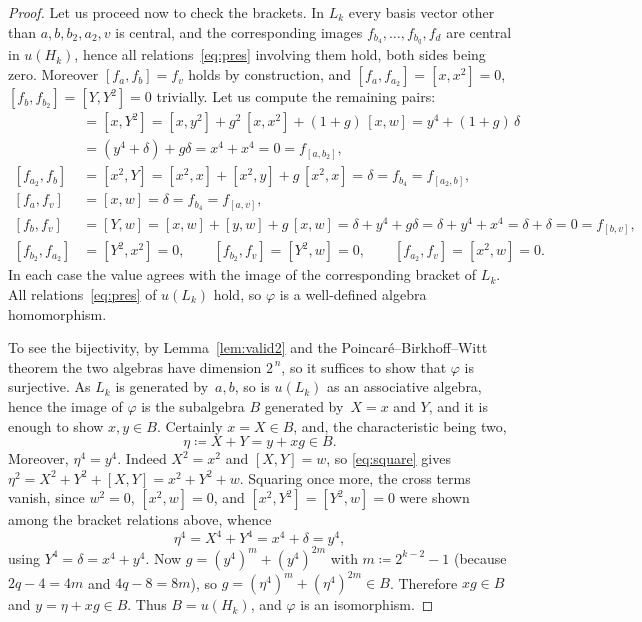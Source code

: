 \documentclass[10pt,a4paper]{amsart}
\begin{document}
\begin{proof}
Let us proceed now to check the brackets. In $L_k$ every basis vector other than
$a,b,b_2,a_2,v$ is central, and the corresponding images
$f_{b_4},\dots,f_{b_q},f_d$ are central in $u(H_k)$, hence all relations~\eqref{eq:pres} involving them hold, both sides being zero. Moreover
$[f_a,f_b]=f_v$ holds by construction, and
$[f_a,f_{a_2}]=[x,x^2]=0$, $[f_b,f_{b_2}]=[Y,Y^2]=0$ trivially. Let us compute the remaining pairs:
\begin{align*}
[f_a,f_{b_2}]&=[x,Y^2]=[x,y^2]+g^2\,[x,x^2]+(1+g)\,[x,w]
=y^4+(1+g)\,\delta\\
&=(y^4+\delta)+g\delta=x^4+x^4=0=f_{[a,b_2]},\\[2pt]
[f_{a_2},f_b]&=[x^2,Y]=[x^2,x]+[x^2,y]+g\,[x^2,x]=\delta
=f_{b_4}=f_{[a_2,b]},\\[2pt]
[f_a,f_v]&=[x,w]=\delta=f_{b_4}=f_{[a,v]},\\[2pt]
[f_b,f_v]&=[Y,w]=[x,w]+[y,w]+g\,[x,w]=\delta+y^4+g\delta
=\delta+y^4+x^4=\delta+\delta=0=f_{[b,v]},\\[2pt]
[f_{b_2},f_{a_2}]&=[Y^2,x^2]=0,\qquad
[f_{b_2},f_v]=[Y^2,w]=0,\qquad
[f_{a_2},f_v]=[x^2,w]=0.
\end{align*} 
In each case the value agrees with
the image of the corresponding bracket of $L_k$. All relations~\eqref{eq:pres} of $u(L_k)$
hold, so $\varphi$ is a well-defined algebra homomorphism.

To see the bijectivity, by Lemma~\ref{lem:valid2} and the
Poincar\'e--Birkhoff--Witt theorem the two algebras have dimension $2^{\,n}$,
so it suffices to show that $\varphi$ is surjective. As $L_k$ is generated by~$a,b$, 
so is $u(L_k)$ as an associative algebra, hence the image of $\varphi$
is the subalgebra $B$ generated by~$X=x$ and $Y$, and it is enough to show
$x,y\in B$. Certainly $x=X\in B$, and, the characteristic being two,
\[
\eta\coloneqq X+Y=y+xg\in B .
\]
Moreover, $\eta^4=y^4$. Indeed $X^2=x^2$ and $[X,Y]=w$, so \eqref{eq:square} gives $\eta^2=X^2+Y^2+[X,Y]=x^2+Y^2+w$. Squaring
once more, the cross terms vanish, since $w^2=0$,
$[x^2,w]=0$, and $[x^2,Y^2]=[Y^2,w]=0$ were shown
among the bracket relations above, whence
\[
\eta^4=X^4+Y^4=x^4+\delta=y^4 ,
\]
using $Y^4=\delta=x^4+y^4$. Now $g=(y^4)^{m}+(y^4)^{2m}$ with
$m\coloneqq 2^{k-2}-1$ (because $2q-4=4m$ and $4q-8=8m$), so
$g=(\eta^4)^{m}+(\eta^4)^{2m}\in B$. Therefore $xg\in B$ and
$y=\eta+xg\in B$. Thus $B=u(H_k)$, and $\varphi$ is an isomorphism.
\end{proof}
\end{document}
